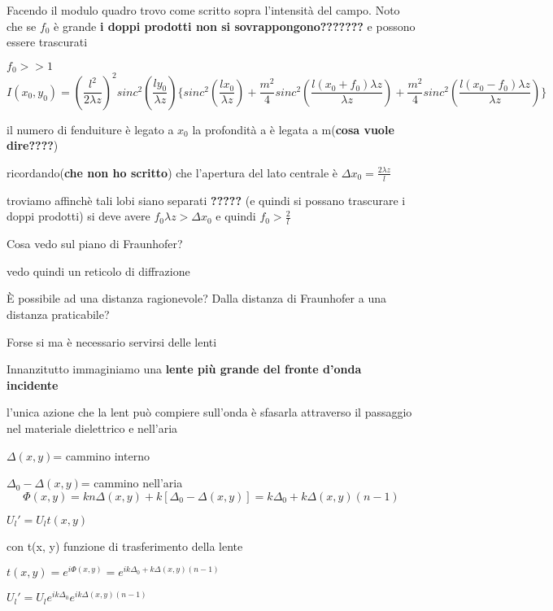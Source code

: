 \documentclass{article}
\begin{document}
Facendo il modulo quadro trovo come scritto sopra l'intensità del campo. Noto che se $f_{0}$ è grande \textbf{ i doppi prodotti non si sovrappongono???????} e possono essere trascurati

$f_{0}>>1$
\begin{equation}
I(x_{0},y_{0}) = (	\frac{l^{2}}{2 \lambda z}	)^{2}	sinc^{2}(\frac{l y_{0}}{ \lambda z}	)\{		sinc^{2}(\frac{l x_{0}}{ \lambda z}	)	+ \frac{m^{2}}{4} sinc^{2}(\frac{l (x_{0} + f_{0}) \lambda z}{ \lambda z}	)		+ \frac{m^{2}}{4} sinc^{2}(\frac{l (x_{0} - f_{0}) \lambda z}{ \lambda z}	)	\}
\end{equation} 


il numero di fenduiture è legato a $x_{0}$ la profondità a è legata a m(\textbf{cosa vuole dire????})

ricordando(\textbf{che non ho scritto}) che l'apertura del lato centrale è 
$\Delta x_{0}= \frac{2 \lambda z}{l}$ 

troviamo affinchè tali lobi siano separati \textbf{?????}  (e quindi si possano trascurare i doppi prodotti) si deve avere $f_{0} \lambda z >\Delta x_{0} $ e quindi $f_{0}>\frac{2}{l}$

Cosa vedo sul piano di Fraunhofer?

vedo quindi un reticolo di diffrazione 

È possibile ad una distanza ragionevole? Dalla distanza di Fraunhofer a una distanza praticabile?

Forse si ma è necessario servirsi delle lenti

Innanzitutto immaginiamo una \textbf{lente più grande del fronte d'onda incidente}

l'unica azione che la lent può compiere sull'onda è sfasarla attraverso il passaggio nel materiale dielettrico e nell'aria

$\Delta (x, y) $= cammino interno

$\Delta_{0} - \Delta (x, y) $= cammino nell'aria
\begin{equation}
\Phi (x, y) = k n \Delta (x, y) + k [\Delta_{0} - \Delta (x, y)] = k \Delta_{0} + k \Delta (x,y) (n-1)
\end{equation}

$U_{l}'=U_{l} t(x,y) $

con t(x, y) funzione di trasferimento della lente 

$t(x,y) = e^{i \Phi (x,y)} = e^{i k \Delta_{0} + k \Delta (x,y) (n-1)}$

$U_{l}'=U_{l} e^{i k \Delta_{0}} e^{i k \Delta (x,y) (n-1)} $
\end{document}
